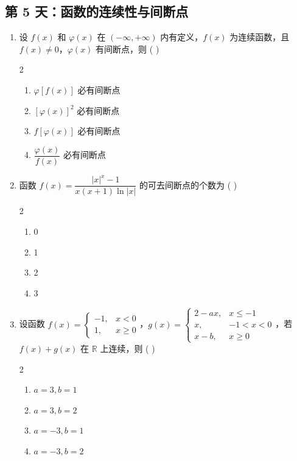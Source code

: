 \newpage
\subsection*{第 5 天：函数的连续性与间断点}
\vspace{1cm}

\begin{enumerate}[label=\textbf{\arabic*.}, itemsep=4.5cm]
    \item 设 $f(x)$ 和 $\varphi(x)$ 在 $(-\infty, +\infty)$ 内有定义，$f(x)$ 为连续函数，且 $f(x) \ne 0$，$\varphi(x)$ 有间断点，则 ( \quad )
    \begin{multicols}{2}
    \begin{enumerate}[label=(\Alph*)]
        \item $\varphi[f(x)]$ 必有间断点
        \item $[\varphi(x)]^2$ 必有间断点
        \item $f[\varphi(x)]$ 必有间断点
        \item $\dfrac{\varphi(x)}{f(x)}$ 必有间断点
    \end{enumerate}
    \end{multicols}

    \item 函数 $f(x) = \dfrac{|x|^x - 1}{x(x+1)\ln|x|}$ 的可去间断点的个数为 ( \quad )
    \begin{multicols}{2}
    \begin{enumerate}[label=(\Alph*)]
        \item 0
        \item 1
        \item 2
        \item 3
    \end{enumerate}
    \end{multicols}

    \item 设函数 $f(x) = \begin{cases} -1, & x < 0 \\ 1, & x \ge 0 \end{cases}$，$g(x) = \begin{cases} 2 - ax, & x \le -1 \\ x, & -1 < x < 0 \\ x - b, & x \ge 0 \end{cases}$，若 $f(x) + g(x)$ 在 $\mathbb{R}$ 上连续，则 ( \quad )
    \begin{multicols}{2}
    \begin{enumerate}[label=(\Alph*)]
        \item $a = 3, b = 1$
        \item $a = 3, b = 2$
        \item $a = -3, b = 1$
        \item $a = -3, b = 2$
    \end{enumerate}
    \end{multicols}
\end{enumerate}

